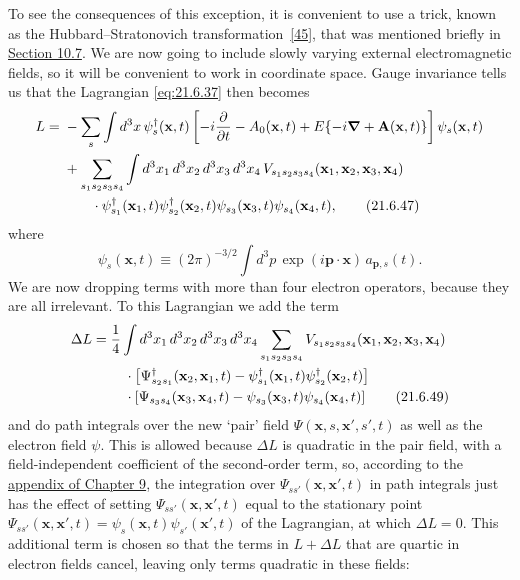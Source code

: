 To see the consequences of this exception, it is convenient to use a trick, known as the Hubbard--Stratonovich transformation~\hyperref[ch21-ref-45]{[45]}, that was mentioned briefly in \hyperref[sec:10.7]{Section 10.7}. We are now going to include slowly varying external electromagnetic fields, so it will be convenient to work in coordinate space. Gauge invariance tells us that the Lagrangian \eqref{eq:21.6.37} then becomes
\begin{align}
L={}&-\sum_s\int d^3x\,
\psi_s^\dagger(\mathbf x,t)
\left[
-i\frac{\partial}{\partial t}-A_0(\mathbf x,t)
+E\{-i\boldsymbol\nabla+\mathbf A(\mathbf x,t)\}
\right]\psi_s(\mathbf x,t)
\notag\\
&+\sum_{s_1s_2s_3s_4}
\int d^3x_1\,d^3x_2\,d^3x_3\,d^3x_4\,
V_{s_1s_2s_3s_4}(\mathbf x_1,\mathbf x_2,\mathbf x_3,\mathbf x_4)
\notag\\
&\qquad\cdot
\psi^\dagger_{s_1}(\mathbf x_1,t)
\psi^\dagger_{s_2}(\mathbf x_2,t)
\psi_{s_3}(\mathbf x_3,t)
\psi_{s_4}(\mathbf x_4,t),
\tag{21.6.47}\label{eq:21.6.47}
\end{align}
where
\begin{equation}
\psi_s(\mathbf x,t)\equiv(2\pi)^{-3/2}
\int d^3p\,\exp(i\mathbf p\cdot\mathbf x)\,a_{\mathbf p,s}(t).
\tag{21.6.48}\label{eq:21.6.48}
\end{equation}
We are now dropping terms with more than four electron operators, because they are all irrelevant. To this Lagrangian we add the term
\begin{align}
\Delta L={}&\frac14
\int d^3x_1\,d^3x_2\,d^3x_3\,d^3x_4
\sum_{s_1s_2s_3s_4}
V_{s_1s_2s_3s_4}(\mathbf x_1,\mathbf x_2,\mathbf x_3,\mathbf x_4)
\notag\\
&\quad\cdot
\left[
\Psi^\dagger_{s_2s_1}(\mathbf x_2,\mathbf x_1,t)
-\psi^\dagger_{s_1}(\mathbf x_1,t)\psi^\dagger_{s_2}(\mathbf x_2,t)
\right]
\notag\\
&\quad\cdot
\left[
\Psi_{s_3s_4}(\mathbf x_3,\mathbf x_4,t)
-\psi_{s_3}(\mathbf x_3,t)\psi_{s_4}(\mathbf x_4,t)
\right]
\tag{21.6.49}\label{eq:21.6.49}
\end{align}
and do path integrals over the new `pair' field $\Psi(\mathbf x,s,\mathbf x',s',t)$ as well as the electron field $\psi$. This is allowed because $\Delta L$ is quadratic in the pair field, with a field-independent coefficient of the second-order term, so, according to the \hyperref[app:9]{appendix of Chapter 9}, the integration over $\Psi_{ss'}(\mathbf x,\mathbf x',t)$ in path integrals just has the effect of setting $\Psi_{ss'}(\mathbf x,\mathbf x',t)$ equal to the stationary point $\Psi_{ss'}(\mathbf x,\mathbf x',t)=\psi_s(\mathbf x,t)\psi_{s'}(\mathbf x',t)$ of the Lagrangian, at which $\Delta L=0$. This additional term is chosen so that the terms in $L+\Delta L$ that are quartic in electron fields cancel, leaving only terms quadratic in these fields:
